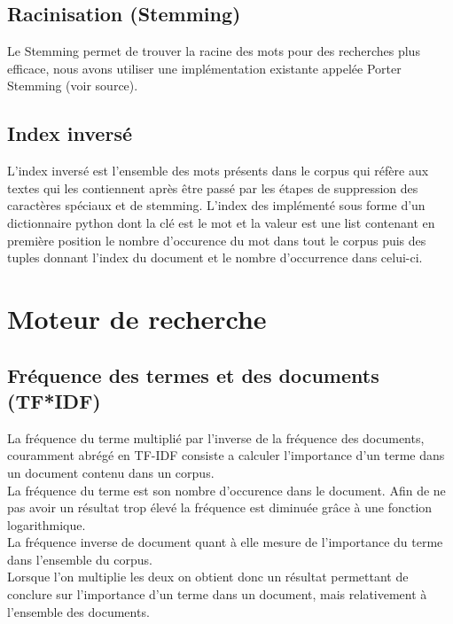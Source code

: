 \documentclass[11pt]{article}
\begin{document}
\subsection{Racinisation (Stemming)}
Le Stemming permet de trouver la racine des mots pour des recherches plus efficace, nous avons utiliser une implémentation existante appelée Porter Stemming (voir source).

\subsection{Index inversé}
L'index inversé est l'ensemble des mots présents dans le corpus qui réfère aux textes qui les contiennent après être passé par les étapes de suppression des caractères spéciaux et de stemming.
L'index des implémenté sous forme d'un dictionnaire python dont la clé est le mot et la valeur est une list contenant en première position le nombre d'occurence du mot dans tout le corpus puis des tuples donnant l'index du document et le nombre d'occurrence dans celui-ci.

\pagebreak
\section{Moteur de recherche}

\subsection{Fréquence des termes et des documents (TF*IDF)}
La fréquence du terme multiplié par l'inverse de la fréquence des documents, couramment abrégé en TF-IDF consiste a calculer l'importance d'un terme dans un document contenu dans un corpus. 
\\La fréquence du terme est son nombre d'occurence dans le document. Afin de ne pas avoir un résultat trop élevé la fréquence est diminuée grâce à une fonction logarithmique. \\
La fréquence inverse de document quant à elle mesure de l'importance du terme dans l'ensemble du corpus. \\
Lorsque l'on multiplie les deux on obtient donc un résultat permettant de conclure sur l'importance d'un terme dans un document, mais relativement à l'ensemble des documents.
\end{document}
